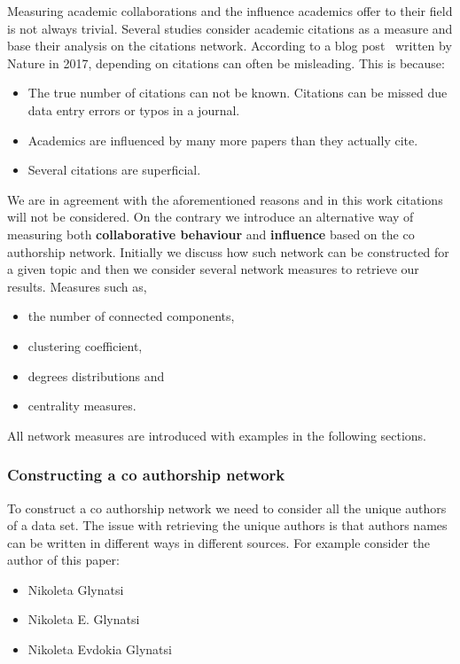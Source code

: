 \documentclass{article}
\begin{document}
Measuring academic collaborations and the influence academics offer to their
field is not always trivial. Several studies consider academic citations as a measure
and base their analysis on the citations network. According to a blog post~\cite{nature_blog} 
written by Nature in 2017, depending on citations can often be misleading.
This is because:

\begin{itemize}
    \item The true number of citations can not be known. Citations can be missed
    due data entry errors or typos in a journal.
    \item Academics are influenced by many more papers than they actually cite.
    \item Several citations are superficial.
\end{itemize}

We are in agreement with the aforementioned reasons and in this work citations
will not be considered. On the contrary we introduce an alternative way of measuring
both \textbf{collaborative behaviour} and \textbf{influence} based on the co authorship network.
Initially we discuss how such network can be constructed for a given topic and
then we consider several network measures to retrieve our results. 
Measures such as,

\begin{itemize}
    \item the number of connected components,
    \item clustering coefficient,
    \item degrees distributions and
    \item centrality measures.
\end{itemize}

All network measures are introduced with examples in the following sections.

\subsubsection{Constructing a co authorship network}

To construct a co authorship network we need to consider all the unique authors of a data set.
The issue with retrieving the unique authors is that authors names can be written
in different ways in different sources. For example consider the author of this
paper:

\begin{itemize}
    \item Nikoleta Glynatsi
    \item Nikoleta E. Glynatsi
    \item Nikoleta Evdokia Glynatsi
\end{itemize}
\end{document}

